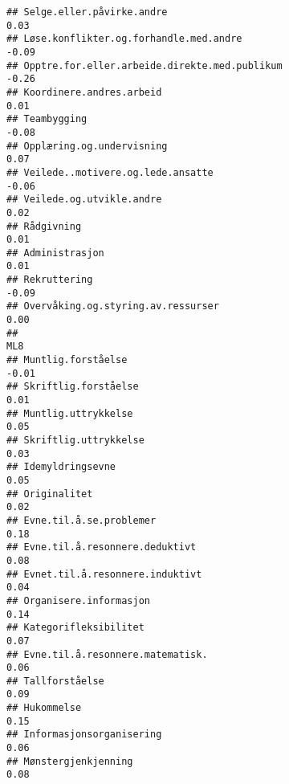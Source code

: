 \documentclass[
]{article}
\begin{document}
\begin{verbatim}
## Selge.eller.påvirke.andre                                                         0.03
## Løse.konflikter.og.forhandle.med.andre                                           -0.09
## Opptre.for.eller.arbeide.direkte.med.publikum                                    -0.26
## Koordinere.andres.arbeid                                                          0.01
## Teambygging                                                                      -0.08
## Opplæring.og.undervisning                                                         0.07
## Veilede..motivere.og.lede.ansatte                                                -0.06
## Veilede.og.utvikle.andre                                                          0.02
## Rådgivning                                                                        0.01
## Administrasjon                                                                    0.01
## Rekruttering                                                                     -0.09
## Overvåking.og.styring.av.ressurser                                                0.00
##                                                                                    ML8
## Muntlig.forståelse                                                               -0.01
## Skriftlig.forståelse                                                              0.01
## Muntlig.uttrykkelse                                                               0.05
## Skriftlig.uttrykkelse                                                             0.03
## Idemyldringsevne                                                                  0.05
## Originalitet                                                                      0.02
## Evne.til.å.se.problemer                                                           0.18
## Evne.til.å.resonnere.deduktivt                                                    0.08
## Evnet.til.å.resonnere.induktivt                                                   0.04
## Organisere.informasjon                                                            0.14
## Kategorifleksibilitet                                                             0.07
## Evne.til.å.resonnere.matematisk.                                                  0.06
## Tallforståelse                                                                    0.09
## Hukommelse                                                                        0.15
## Informasjonsorganisering                                                          0.06
## Mønstergjenkjenning                                                               0.08

\end{verbatim}
\end{document}
